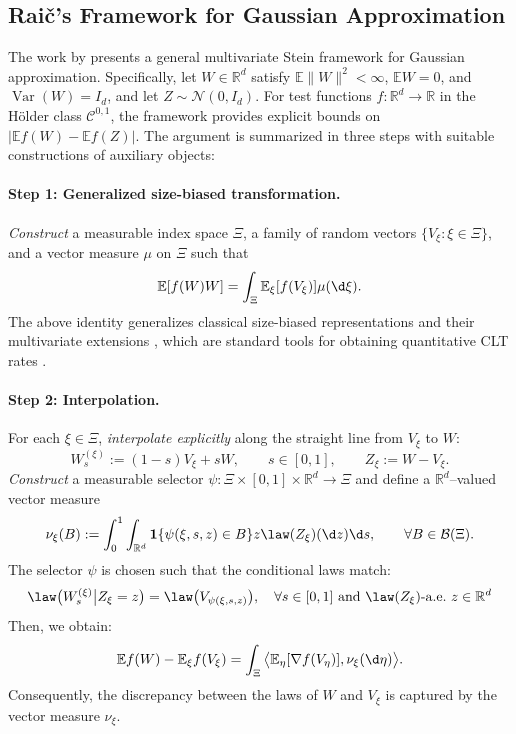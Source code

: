\documentclass[mnsc,nonblindrev]{informs3}
\begin{document}
\subsection{Rai\v{c}'s Framework for Gaussian Approximation}\label{sec:raivc}
The work by \cite{raivc2018multivariate} presents a general multivariate Stein framework for Gaussian approximation. Specifically, let \(W\in\mathbb{R}^d\) satisfy \(\mathbb{E}\|W\|^2<\infty\), \(\mathbb{E}W=0\), and \(\operatorname{Var}(W)=I_d\), and let \(Z\sim\mathcal N(0,I_d)\). For test functions \(f:\mathbb{R}^d\to\mathbb{R}\) in the Hölder class \(\mathcal C^{0,1}\), the framework provides explicit bounds on \(|\mathbb{E}f(W)-\mathbb{E}f(Z)|\). The argument is summarized in three steps with suitable constructions of auxiliary objects:

\paragraph{Step 1:  Generalized size-biased transformation.} \textit{Construct} a measurable index space $\Xi$, a family of random vectors
$\{V_\xi:\xi\in\Xi\}$, and a vector measure $\mu$ on $\Xi$ such that
\[
\mathbb{E}[f(W)W]=\int_{\Xi}\mathbb{E}_\xi[f(V_\xi)]\mu(\d\xi).
\]
The above identity generalizes classical size-biased representations
\citep{baldi1989normal} and their multivariate extensions
\citep{goldstein1996multivariate}, which are standard tools for obtaining
quantitative CLT rates \citep{chen2010normal}.

\paragraph{Step 2: Interpolation.}
For each $\xi\in\Xi$, \emph{interpolate explicitly} along the straight line from $V_\xi$ to $W$:
\[
W_s^{(\xi)}:=(1-s)V_\xi+sW,\qquad s\in[0,1],\qquad Z_\xi:=W-V_\xi.
\]
\textit{Construct} a measurable selector
$\psi:\Xi\times[0,1]\times\mathbb{R}^d\to\Xi$ and define a $\mathbb{R}^d$–valued vector measure
\[
\nu_\xi(B):=\int_0^1\int_{\mathbb{R}^d}
\mathbf{1}\{\psi(\xi,s,z)\in B\} z
\law(Z_\xi)(\d z)\d s,\qquad \forall B\in\mathcal{B}(\Xi).
\]
The selector \(\psi\) is chosen such that the conditional laws match:
\begin{equation}\label{eq:stablility}
    \law\big(W_s^{(\xi)}\big|Z_\xi=z\big)=\law\big(V_{\psi(\xi,s,z)}\big),
\quad \forall s\in[0,1] \text{ and }\law(Z_\xi)\text{-a.e.\ }z\in\mathbb{R}^d
\end{equation}
Then, we obtain:
\[
\mathbb{E}f(W)-\mathbb{E}_\xi f(V_\xi)=\int_{\Xi}\big\langle \mathbb{E}_\eta[\nabla f(V_\eta)],\nu_\xi(\d\eta)\big\rangle.
\]
Consequently, the discrepancy between the laws of $W$ and $V_\xi$ is captured by the
vector measure $\nu_\xi$.
\end{document}
